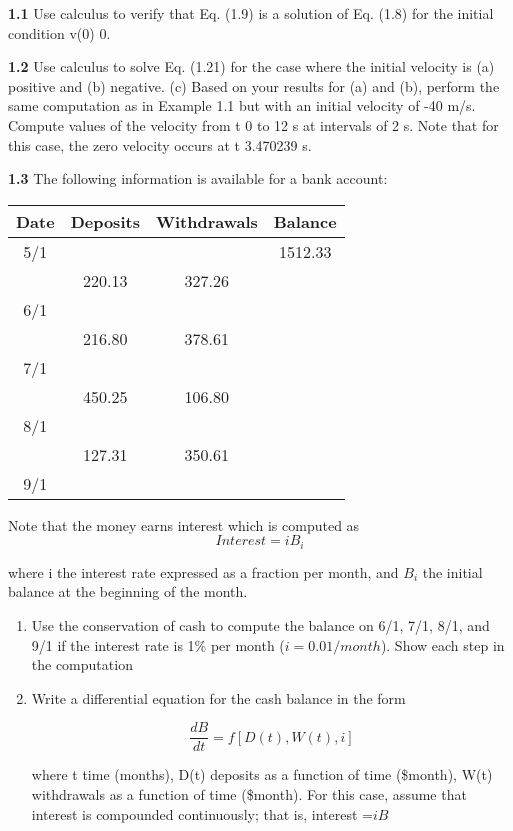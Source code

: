 \documentclass[../main.tex]{subfiles}
\begin{document}
\begin{multicols}{2}
	
	\textbf{1.1} Use calculus to verify that Eq. (1.9) is a solution of
Eq. (1.8) for the initial condition v(0)  0.


\textbf{1.2} Use calculus to solve Eq. (1.21) for the case where the initial velocity is (a) positive and (b) negative. (c) Based on your
results for (a) and (b), perform the same computation as in Example 1.1 but with an initial velocity of -40 m/s. Compute
values of the velocity from t  0 to 12 s at intervals of 2 s. Note
that for this case, the zero velocity occurs at t  3.470239 s.


\textbf{1.3} The following information is available for a bank account:

\begin{table}[H]
	
		\begin{tabular}{cccc }
			\hline
			Date &Deposits& Withdrawals &Balance\\
			\hline
			5/1&&& 1512.33\\
			&220.13& 327.26&\\
			6/1&&&\\
			&216.80& 378.61&\\
			7/1&&&\\
			&450.25 &106.80&\\
			8/1&&&\\
			&127.31 &350.61&\\
			9/1&&&\\
			\hline
		\end{tabular}
\end{table}

Note that the money earns interest which is computed as
$$Interest = i B_i $$

where i  the interest rate expressed as a fraction per month,
and $B_i$ the initial balance at the beginning of the month.
\begin{enumerate}[label=(\alph*)]
	\item Use the conservation of cash to compute the balance on
	6/1, 7/1, 8/1, and 9/1 if the interest rate is 1\% per month
	($i =  0.01/month$). Show each step in the computation
	\item Write a differential equation for the cash balance in the
	form

	$$\dfrac{dB}{dt}=f[D(t), W(t), i  ]$$

	where t  time (months), D(t)  deposits as a function
of time (\$\/month), W(t)  withdrawals as a function of
time (\$\/month). For this case, assume that interest  is
compounded continuously; that is, interest  =$iB$


\end{enumerate}
\end{multicols}
\end{document}
